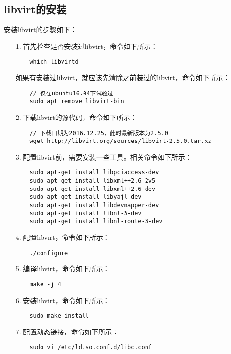 \documentclass[a4paper,left=2.5cm,right=2.5cm,11pt]{article}
\begin{document}
	\clearpage

\subsection{libvirt的安装}
	安装libvirt的步骤如下：
	\begin{itemize}
		\item[1.] 首先检查是否安装过libvirt，命令如下所示：
		\begin{lstlisting}
	which libvirtd
		\end{lstlisting}

		如果有安装过libvirt，就应该先清除之前装过的libvirt，命令如下所示：
		\begin{lstlisting}
	// 仅在ubuntu16.04下试验过
	sudo apt remove libvirt-bin
		\end{lstlisting}

		\item[2.] 下载libvirt的源代码，命令如下所示：
		\begin{lstlisting}
	// 下载日期为2016.12.25，此时最新版本为2.5.0
	wget http://libvirt.org/sources/libvirt-2.5.0.tar.xz
		\end{lstlisting}

		\item[3.] 配置libvirt前，需要安装一些工具。相关命令如下所示：
		\begin{lstlisting}
	sudo apt-get install libpciaccess-dev
	sudo apt-get install libxml++2.6-2v5
	sudo apt-get install libxml++2.6-dev
	sudo apt-get install libyajl-dev
	sudo apt-get install libdevmapper-dev
	sudo apt-get install libnl-3-dev
	sudo apt-get install libnl-route-3-dev
		\end{lstlisting}

		\item[4.] 配置libvirt，命令如下所示：
		\begin{lstlisting}
	./configure
		\end{lstlisting}

		\item[5.] 编译libvirt，命令如下所示：
		\begin{lstlisting}
	make -j 4
		\end{lstlisting}

		\item[6.] 安装libvirt，命令如下所示：
		\begin{lstlisting}
	sudo make install
		\end{lstlisting}

		\item[7.] 配置动态链接，命令如下所示：
		\begin{lstlisting}
	sudo vi /etc/ld.so.conf.d/libc.conf
		\end{lstlisting}


\end{itemize}
\end{document}
